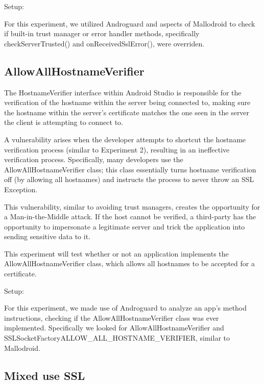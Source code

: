         Setup:

        For this experiment, we utilized Androguard and aspects of Mallodroid to
        check if built-in trust manager or error handler methods, specifically
        checkServerTrusted() and onReceivedSslError(), were overriden.

    \subsection{AllowAllHostnameVerifier}
    
        The HostnameVerifier interface within Android Studio is responsible for the 
        verification of the hostname within the server being connected to, making 
        sure the hostname within the server's certificate matches the one 
        seen in the server the client is attempting to connect to. 

        A vulnerability arises when the developer attempts to shortcut the 
        hostname verification process (similar to Experiment 2), resulting 
        in an ineffective verification process. Specifically, many 
        developers use the AllowAllHostnameVerifier class; this class 
        essentially turns hostname verification off (by allowing all 
        hostnames) and instructs the process to never throw an SSL 
        Exception.

        This vulnerability, similar to avoiding trust managers, creates 
        the opportunity for a Man-in-the-Middle attack. If the host 
        cannot be verified, a third-party has the opportunity to impersonate
        a legitimate server and trick the application into sending 
        sensitive data to it.

        This experiment will test whether or not an application 
        implements the AllowAllHostnameVerifier class, which allows 
        all hostnames to be accepted for a certificate.

        Setup:

        For this experiment, we made use of Androguard to analyze an app's 
        method instructions, checking if the AllowAllHostnameVerifier class was ever 
        implemented. Specifically we looked for AllowAllHostnameVerifier and 
        SSLSocketFactory\;\-\>ALLOW\_ALL\_HOSTNAME\_VERIFIER, similar to Mallodroid.


    \subsection{Mixed use SSL}

